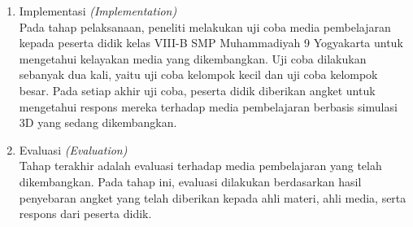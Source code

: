\begin{enumerate}
\begin{enumerate}
\item Pembuatan Produk\\
\hspace*{1cm}Pembuatan produk diawali dengan mengimplementasikan desain yang telah disusun pada tahap sebelumnya. Kegiatan ini mencakup pengembangan antarmuka (\textit{user interface}), pembuatan model tiga dimensi menggunakan Blender, pengembangan simulasi 3D, serta perancangan sistem evaluasi pembelajaran yang terintegrasi dalam media.
\item Validasi Produk\\
\hspace*{1cm}Sebelum dilakukan uji coba, produk yang telah dikembangkan terlebih dahulu dikonsultasikan dengan dosen pembimbing untuk memperoleh masukan awal. Selanjutnya, media divalidasi oleh ahli materi dan ahli media guna mengetahui tingkat kelayakan produk. Ahli materi terdiri atas dosen Pendidikan Matematika Universitas Ahmad Dahlan dan guru matematika di SMP Muhammadiyah 9 Yogyakarta. Proses validasi ini bertujuan untuk menilai kesesuaian isi materi, tampilan media, serta aspek pembelajaran yang terdapat dalam produk.

\item Revisi Produk\\
\hspace*{1cm}Produk yang telah melalui tahap validasi selanjutnya direvisi berdasarkan saran dan masukan dari ahli materi maupun ahli media. Revisi dilakukan untuk menyempurnakan kualitas media, baik dari segi isi, tampilan, maupun fungsionalitas, sehingga produk yang dihasilkan menjadi lebih layak, menarik, dan sesuai dengan tujuan pembelajaran.

\end{enumerate}
\newpage
    \item Implementasi \textit{(Implementation)}\\
    \hspace*{1cm}Pada tahap pelaksanaan, peneliti melakukan uji coba media pembelajaran kepada peserta didik kelas VIII-B SMP Muhammadiyah 9 Yogyakarta untuk mengetahui kelayakan media yang dikembangkan. Uji coba dilakukan sebanyak dua kali, yaitu uji coba kelompok kecil dan uji coba kelompok besar. Pada setiap akhir uji coba, peserta didik diberikan angket untuk mengetahui respons mereka terhadap media pembelajaran berbasis simulasi 3D yang sedang dikembangkan.

    \item Evaluasi \textit{(Evaluation)}\\
    \hspace*{1cm}Tahap terakhir adalah evaluasi terhadap media pembelajaran yang telah dikembangkan. Pada tahap ini, evaluasi dilakukan berdasarkan hasil penyebaran angket yang telah diberikan kepada ahli materi, ahli media, serta respons dari peserta didik.\\


\end{enumerate}

